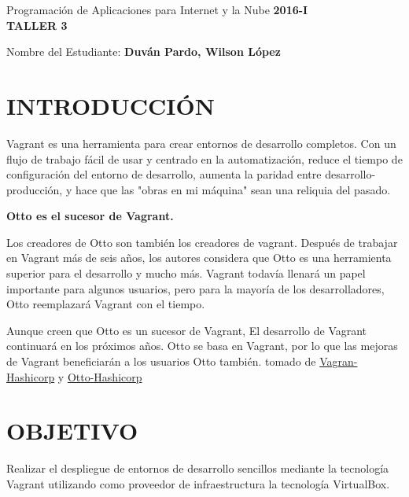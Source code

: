 \documentclass[10pt]{article}   			%
\begin{document}
	\renewcommand{\headrulewidth}{0.5pt}

	\thispagestyle{empty}						%
	\begin{center}
		\large {Programación de Aplicaciones para Internet y la Nube
			\hspace{5 cm}\textbf{2016-I}}
		\bigskip  
		\textbf{
				\LARGE{\\TALLER 3}}\\								%
	\end{center}	
	\begin{flushright}	
		\bigskip	
		Nombre del Estudiante: \textbf{Duván Pardo, Wilson López}			%
	\end{flushright} 
	

\section{INTRODUCCIÓN}
Vagrant es una herramienta para crear entornos de desarrollo completos. Con un flujo de trabajo fácil de usar y centrado en la automatización, reduce el tiempo de configuración del entorno de desarrollo, aumenta la paridad entre desarrollo-producción, y hace que las "obras en mi máquina" sean una reliquia del pasado.


\textbf{Otto es el sucesor de Vagrant.}

Los creadores de Otto son también los creadores de vagrant. Después de trabajar en Vagrant más de seis años, los autores considera que Otto es una herramienta superior para el desarrollo y mucho más. Vagrant todavía llenará un papel importante para algunos usuarios, pero para la mayoría de los desarrolladores, Otto reemplazará Vagrant con el tiempo.

Aunque creen que Otto es un sucesor de Vagrant, El desarrollo de Vagrant continuará en los próximos años. Otto se basa en Vagrant, por lo que las mejoras de Vagrant beneficiarán a los usuarios Otto también. tomado de \href{https://www.vagrantup.com/about.html}{Vagran-Hashicorp} y \href{https://www.ottoproject.io/intro/vagrant-successor.html}{Otto-Hashicorp}






\section{OBJETIVO}
Realizar el despliegue de entornos de desarrollo sencillos mediante la tecnología Vagrant utilizando como proveedor de infraestructura la tecnología VirtualBox.
\end{document}
